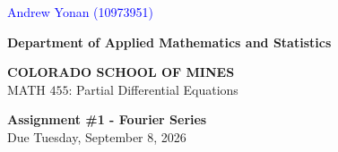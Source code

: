 \documentclass[12pt]{article}
\begin{document}
\begin{flushleft}

\textcolor{blue}{Andrew Yonan (10973951)}

\textbf{Department of Applied Mathematics and Statistics}

\textbf{COLORADO SCHOOL OF MINES}\\


MATH $455$: Partial Differential Equations
\end{flushleft}

\vspace{0.1in}

\begin{center}
{\bf Assignment \#1 - Fourier Series} \\
Due Tuesday, September 8, 2026 \\
\end{center}

\vspace{0.3in}
\end{document}
